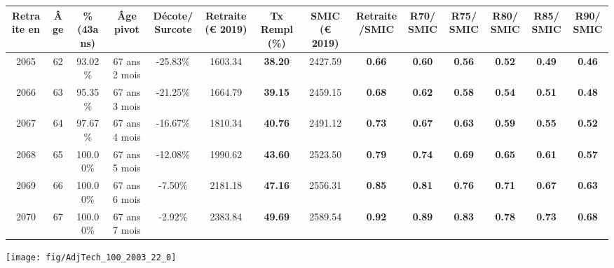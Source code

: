 \begin{adjustbox}{max width=\textwidth} 
\begin{tabular}[htb]{|c|c||c|c|c||c|c||c|c||c|c|c|c|c|} 
\hline 
 Retraite en &  Âge &  \%(43ans) &  Âge pivot &  Décote/Surcote &  Retraite (\euro{} 2019) &  Tx Rempl(\%) &  SMIC (\euro{} 2019) &  Retraite/SMIC &  R70/SMIC &  R75/SMIC &  R80/SMIC &  R85/SMIC &  R90/SMIC \\ 
\hline \hline 
 2065 &  62 &  93.02\% &  67 ans 2 mois &  -25.83\% &  1603.34 &  {\bf 38.20} &  2427.59 &  {\bf {\color{red} 0.66}} &  {\bf {\color{red} 0.60}} &  {\bf {\color{red} 0.56}} &  {\bf {\color{red} 0.52}} &  {\bf {\color{red} 0.49}} &  {\bf {\color{red} 0.46}} \\ 
\hline 
 2066 &  63 &  95.35\% &  67 ans 3 mois &  -21.25\% &  1664.79 &  {\bf 39.15} &  2459.15 &  {\bf {\color{red} 0.68}} &  {\bf {\color{red} 0.62}} &  {\bf {\color{red} 0.58}} &  {\bf {\color{red} 0.54}} &  {\bf {\color{red} 0.51}} &  {\bf {\color{red} 0.48}} \\ 
\hline 
 2067 &  64 &  97.67\% &  67 ans 4 mois &  -16.67\% &  1810.34 &  {\bf 40.76} &  2491.12 &  {\bf {\color{red} 0.73}} &  {\bf {\color{red} 0.67}} &  {\bf {\color{red} 0.63}} &  {\bf {\color{red} 0.59}} &  {\bf {\color{red} 0.55}} &  {\bf {\color{red} 0.52}} \\ 
\hline 
 2068 &  65 &  100.00\% &  67 ans 5 mois &  -12.08\% &  1990.62 &  {\bf 43.60} &  2523.50 &  {\bf {\color{red} 0.79}} &  {\bf {\color{red} 0.74}} &  {\bf {\color{red} 0.69}} &  {\bf {\color{red} 0.65}} &  {\bf {\color{red} 0.61}} &  {\bf {\color{red} 0.57}} \\ 
\hline 
 2069 &  66 &  100.00\% &  67 ans 6 mois &  -7.50\% &  2181.18 &  {\bf 47.16} &  2556.31 &  {\bf {\color{red} 0.85}} &  {\bf {\color{red} 0.81}} &  {\bf {\color{red} 0.76}} &  {\bf {\color{red} 0.71}} &  {\bf {\color{red} 0.67}} &  {\bf {\color{red} 0.63}} \\ 
\hline 
 2070 &  67 &  100.00\% &  67 ans 7 mois &  -2.92\% &  2383.84 &  {\bf 49.69} &  2589.54 &  {\bf {\color{red} 0.92}} &  {\bf {\color{red} 0.89}} &  {\bf {\color{red} 0.83}} &  {\bf {\color{red} 0.78}} &  {\bf {\color{red} 0.73}} &  {\bf {\color{red} 0.68}} \\ 
\hline 
\hline 
\end{tabular} 
\end{adjustbox} 
 
 \vspace{0.1cm} 

 {\hspace{-2.2cm}\texttt{[image: fig/AdjTech\_100\_2003\_22\_0]}} 

